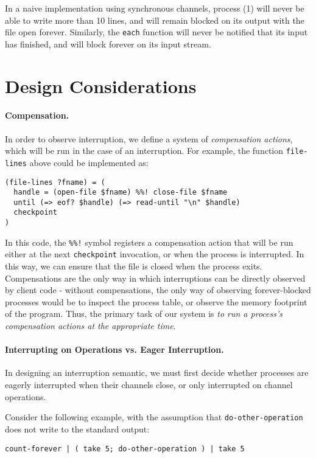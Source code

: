 \documentclass[sigplan,10pt,nosumlimits]{acmart}
\begin{document}
In a naive implementation using synchronous channels, process (1) will never be able to write more than 10 lines, and will remain blocked on its output with the file open forever.
Similarly, the \verb/each/ function will never be notified that its input has finished, and will block forever on its input stream.

\section{Design Considerations}
\paragraph{Compensation.} In order to observe interruption, we define a system of \emph{compensation actions}, which will be run in the case of an interruption.
For example, the function \verb/file-lines/ above could be implemented as:

\begin{verbatim}
(file-lines ?fname) = (
  handle = (open-file $fname) %%! close-file $fname
  until (=> eof? $handle) (=> read-until "\n" $handle)
  checkpoint
)
\end{verbatim}

In this code, the \verb/%%!/ symbol registers a compensation action that will be run either at the next \verb/checkpoint/ invocation, or when the process is interrupted. In this way, we can ensure that the file is closed when the process exits. Compensations are the only way in which interruptions can be directly observed by client code - without compensations, the only way of observing forever-blocked processes would be to inspect the process table, or observe the memory footprint of the program. Thus, the primary task of our system is \emph{to run a process's compensation actions at the appropriate time}.

\paragraph{Interrupting on Operations vs. Eager Interruption.}

In designing an interruption semantic, we must first decide whether processes are eagerly interrupted when their channels close, or only interrupted on channel operations.

Consider the following example, with the assumption that \verb/do-other-operation/ does not write to the standard output:

\begin{verbatim}
count-forever | ( take 5; do-other-operation ) | take 5
\end{verbatim}
\end{document}
